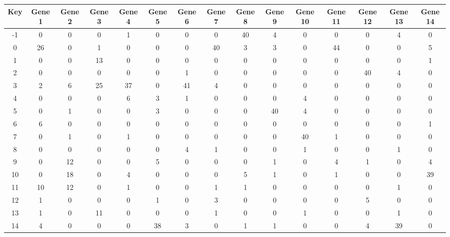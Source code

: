 \begin{tabular}{|c|c|c|c|c|c|c|c|c|c|c|c|c|c|c|}
\hline
Key & Gene 1 & Gene 2 & Gene 3 & Gene 4 & Gene 5 & Gene 6 & Gene 7 & Gene 8 & Gene 9 & Gene 10 & Gene 11 & Gene 12 & Gene 13 & Gene 14 \\
\hline
-1 & 0 & 0 & 0 & 1 & 0 & 0 & 0 & 40 & 4 & 0 & 0 & 0 & 4 & 0 \\
0 & 26 & 0 & 1 & 0 & 0 & 0 & 40 & 3 & 3 & 0 & 44 & 0 & 0 & 5 \\
1 & 0 & 0 & 13 & 0 & 0 & 0 & 0 & 0 & 0 & 0 & 0 & 0 & 0 & 1 \\
2 & 0 & 0 & 0 & 0 & 0 & 1 & 0 & 0 & 0 & 0 & 0 & 40 & 4 & 0 \\
3 & 2 & 6 & 25 & 37 & 0 & 41 & 4 & 0 & 0 & 0 & 0 & 0 & 0 & 0 \\
4 & 0 & 0 & 0 & 6 & 3 & 1 & 0 & 0 & 0 & 4 & 0 & 0 & 0 & 0 \\
5 & 0 & 1 & 0 & 0 & 3 & 0 & 0 & 0 & 40 & 4 & 0 & 0 & 0 & 0 \\
6 & 6 & 0 & 0 & 0 & 0 & 0 & 0 & 0 & 0 & 0 & 0 & 0 & 0 & 1 \\
7 & 0 & 1 & 0 & 1 & 0 & 0 & 0 & 0 & 0 & 40 & 1 & 0 & 0 & 0 \\
8 & 0 & 0 & 0 & 0 & 0 & 4 & 1 & 0 & 0 & 1 & 0 & 0 & 1 & 0 \\
9 & 0 & 12 & 0 & 0 & 5 & 0 & 0 & 0 & 1 & 0 & 4 & 1 & 0 & 4 \\
10 & 0 & 18 & 0 & 4 & 0 & 0 & 0 & 5 & 1 & 0 & 1 & 0 & 0 & 39 \\
11 & 10 & 12 & 0 & 1 & 0 & 0 & 1 & 1 & 0 & 0 & 0 & 0 & 1 & 0 \\
12 & 1 & 0 & 0 & 0 & 1 & 0 & 3 & 0 & 0 & 0 & 0 & 5 & 0 & 0 \\
13 & 1 & 0 & 11 & 0 & 0 & 0 & 1 & 0 & 0 & 1 & 0 & 0 & 1 & 0 \\
14 & 4 & 0 & 0 & 0 & 38 & 3 & 0 & 1 & 1 & 0 & 0 & 4 & 39 & 0 \\
\hline
\end{tabular}